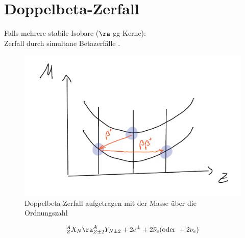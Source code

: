 \section{Doppelbeta-Zerfall}
Falls mehrere stabile Isobare ($\ra$ gg-Kerne):\\
Zerfall durch  simultane Betazerfälle\grqq{} .
\begin{figure}[!ht]
\centering
\includegraphics[width=.5\textwidth]{imgs/ep5-fig-5-11.pdf}
\caption{Doppelbeta-Zerfall aufgetragen mit der Masse über die Ordnungszahl\label{fig:5.11}}
\end{figure}
\begin{align}
 ^A_Z X_N \ra ^A_{Z\pm 2} Y_{N\pm 2} + 2e^\pm + 2 \bar{\nu}_e (\text{oder } + 2\nu_e)
\end{align}

